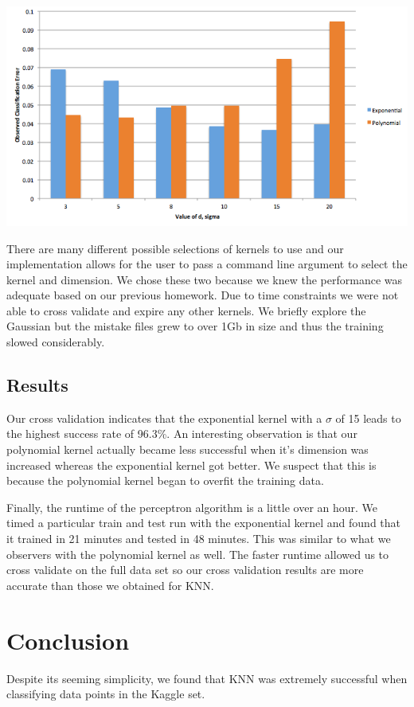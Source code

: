 \documentclass{article} %
\begin{document}
\begin{center}
\includegraphics[scale=.7]{cv.png}
\end{center}

There are many different possible selections of kernels to use and our implementation
allows for the user to pass a command line argument to select the kernel and dimension.
We chose these two because we knew the performance was adequate based on our
previous homework. Due to time constraints we were not able to cross validate and expire
any other kernels.  We briefly explore the Gaussian but the mistake files grew to over 
1Gb in size and thus the training slowed considerably. 


\subsection{Results}

Our cross validation indicates that the exponential kernel with a $\sigma$ of 15
leads to the highest success rate of 96.3\%. An interesting observation is that
our polynomial kernel actually became less successful when it's dimension was
increased whereas the exponential kernel got better. We suspect that this is
because the polynomial kernel began to overfit the training data.

Finally, the runtime of the perceptron algorithm is a little over an hour. We timed
a particular train and test run with the exponential kernel and found that it trained
in 21 minutes and tested in 48 minutes.  This was similar to what we observers
with the polynomial kernel as well. The faster runtime allowed us to cross validate 
on the full data set so our cross validation results are more accurate than those 
we obtained for KNN.

\section{Conclusion}
Despite its seeming simplicity, we found that KNN was extremely successful
when classifying data points in the Kaggle set.
\end{document}
